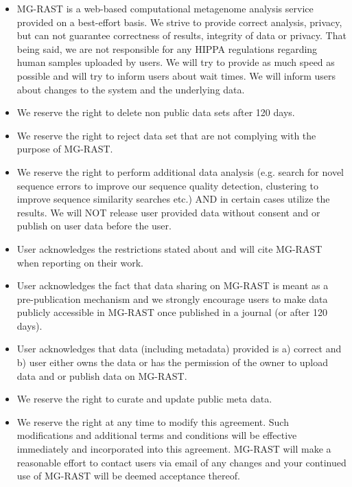\documentclass[12pt,fullpage]{report}
\begin{document}
\begin{appendices}
\begin{itemize}
\item MG-RAST is a web-based computational metagenome analysis service provided on a best-effort basis. We strive to provide correct analysis, privacy, but can not guarantee correctness of results, integrity of data or privacy. That being said, we are not responsible for any HIPPA regulations regarding human samples uploaded by users. We will try to provide as much speed as possible and will try to inform users about wait times. We will inform users about changes to the system and the underlying data.
\item We reserve the right to delete non public data sets after 120 days.
\item We reserve the right to reject data set that are not complying with the purpose of MG-RAST.
\item We reserve the right to perform additional data analysis (e.g. search for novel sequence errors to improve our sequence quality detection, clustering to improve sequence similarity searches etc.) AND in certain cases utilize the results. We will NOT release user provided data without consent and or publish on user data before the user.
\item User acknowledges the restrictions stated about and will cite MG-RAST when reporting on their work.
\item User acknowledges the fact that data sharing on MG-RAST is meant as a pre-publication mechanism and we strongly encourage users to make data publicly accessible in MG-RAST once published in a journal (or after 120 days).
\item User acknowledges that data (including metadata) provided is a) correct and b) user either owns the data or has the permission of the owner to upload data and or publish data on MG-RAST.
\item We reserve the right to curate and update public meta data.
\item We reserve the right at any time to modify this agreement. Such modifications and additional terms and conditions will be effective immediately and incorporated into this agreement. MG-RAST will make a reasonable effort to contact users via email of any changes and your continued use of MG-RAST will be deemed acceptance thereof.
\end{itemize}

\end{appendices}
\end{document}
